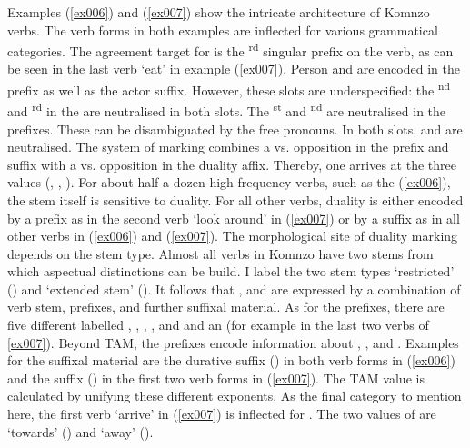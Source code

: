 Examples (\ref{ex006}) and (\ref{ex007}) show the intricate architecture of Komnzo verbs. The verb forms in both examples are inflected for various grammatical categories. The agreement target for  is the \Third\textsuperscript{rd}  singular prefix on the verb, as can be seen in the last verb `eat' in example (\ref{ex007}). Person and  are encoded in the  prefix as well as the actor suffix. However, these slots are underspecified: the \Second{}\textsuperscript{nd} and \Third\textsuperscript{rd}  in the  are neutralised in both slots. The \First\textsuperscript{st}  and \Second\textsuperscript{nd}  are neutralised in the prefixes. These can be disambiguated by the free pronouns. In both slots,  and  are neutralised. The system of  marking combines a  vs.  opposition in the prefix and suffix with a  vs.  opposition in the duality affix. Thereby, one arrives at the three  values (\Sg, \Du, \Pl). For about half a dozen high frequency verbs, such as the  (\ref{ex006}), the stem itself is sensitive to duality. For all other verbs, duality is either encoded by a prefix as in the second verb `look around' in (\ref{ex007}) or by a suffix as in all other verbs in (\ref{ex006}) and (\ref{ex007}). The morphological site of duality marking depends on the stem type. Almost all verbs in Komnzo have two stems from which aspectual distinctions can be build. I label the two stem types `restricted' (\Rs{}) and `extended stem' (\Ext). It follows that ,  and  are expressed by a combination of verb stem, prefixes, and further suffixal material. As for the prefixes, there are five different  labelled \Alph{}, \Bet{}, \Betaone{}, \Betatwo{}, and \Gam{} and an   (for example in the last two verbs of \ref{ex007}). Beyond TAM, the prefixes encode information about , , and . Examples for the suffixal material are the durative suffix (\Dur{}) in both verb forms in (\ref{ex006}) and the  suffix (\Pst{}) in the first two verb forms in (\ref{ex007}). The TAM value is calculated by unifying these different exponents. As the final category to mention here, the first verb `arrive' in (\ref{ex007}) is inflected for . The two values of  are  `towards' (\Venit) and  `away' (\Andat).%

